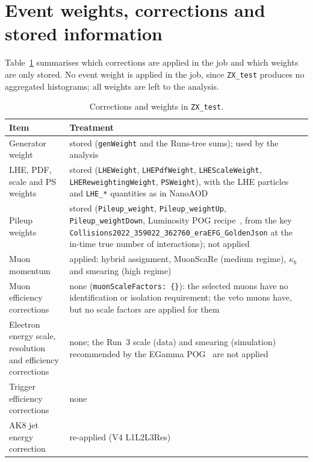\documentclass[11pt]{article}
\newcommand{\code}[1]{\texttt{#1}}
\begin{document}
\section{Event weights, corrections and stored information}
\label{sec:weights}
\label{sec:output}

Table~\ref{tab:corrections} summarises which corrections are applied in the job and which weights are only stored. No
event weight is applied in the job, since \code{ZX\_test} produces no aggregated histograms; all weights are left to
the analysis.

\begin{table}[htbp]
\centering
\caption{Corrections and weights in \code{ZX\_test}.}
\label{tab:corrections}
\small
\begin{tabularx}{\textwidth}{>{\raggedright\arraybackslash}p{4.2cm}>{\raggedright\arraybackslash}X}
\toprule
Item & Treatment \\
\midrule
Generator weight & stored (\code{genWeight} and the Runs-tree sums); used by the analysis \\
LHE, PDF, scale and PS weights & stored (\code{LHEWeight}, \code{LHEPdfWeight}, \code{LHEScaleWeight},
  \code{LHEReweightingWeight}, \code{PSWeight}), with the LHE particles and \code{LHE\_*} quantities as in NanoAOD \\
Pileup weights & stored (\code{Pileup\_weight}, \code{Pileup\_weightUp}, \code{Pileup\_weightDown}, Luminosity POG
  recipe~\cite{LUMpileup}, from the key
  \code{Collisions2022\_359022\_362760\_eraEFG\_GoldenJson} at the in-time true number of interactions); not applied \\
Muon momentum & applied: hybrid assignment, MuonScaRe (medium regime), $\kappa_b$ and smearing (high
  regime)~\cite{MUOcorrections,MUOscare} \\
Muon efficiency corrections & none (\code{muonScaleFactors: \{\}}): the selected muons have no identification or
  isolation requirement; the veto muons have, but no scale factors are applied for them \\
Electron energy scale, resolution and efficiency corrections & none; the Run~3 scale (data) and smearing (simulation)
  recommended by the EGamma POG~\cite{EGMsas} are not applied \\
Trigger efficiency corrections & none \\
AK8 jet energy correction & re-applied (V4 L1L2L3Res)~\cite{JMEjerc} \\

\end{tabularx}
\end{table}
\end{document}

